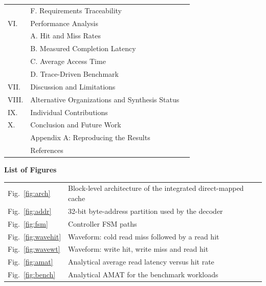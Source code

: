 \documentclass[conference,a4paper]{IEEEtran}
\begin{document}
\begin{tabular}{@{}p{1.2cm}p{12cm}r@{}}
 & \hspace{1em}F. Requirements Traceability & \pageref{sec:trace2}\\
VI. & Performance Analysis & \pageref{sec:perf}\\
 & \hspace{1em}A. Hit and Miss Rates & \pageref{sec:hit}\\
 & \hspace{1em}B. Measured Completion Latency & \pageref{sec:lat}\\
 & \hspace{1em}C. Average Access Time & \pageref{sec:amat}\\
 & \hspace{1em}D. Trace-Driven Benchmark & \pageref{sec:bench}\\
VII. & Discussion and Limitations & \pageref{sec:disc}\\
VIII. & Alternative Organizations and Synthesis Status & \pageref{sec:alt}\\
IX. & Individual Contributions & \pageref{sec:contrib}\\
X. & Conclusion and Future Work & \pageref{sec:concl}\\
 & Appendix A: Reproducing the Results & \pageref{app:repro}\\
 & References & \pageref{sec:refs}\\
\end{tabular}

\vspace{0.3cm}
\noindent\textbf{List of Figures}\\[2pt]
\begin{tabular}{@{}p{1.6cm}p{11.6cm}r@{}}
Fig.~\ref{fig:arch} & Block-level architecture of the integrated direct-mapped cache & \pageref{fig:arch}\\
Fig.~\ref{fig:addr} & 32-bit byte-address partition used by the decoder & \pageref{fig:addr}\\
Fig.~\ref{fig:fsm} & Controller FSM paths & \pageref{fig:fsm}\\
Fig.~\ref{fig:wavehit} & Waveform: cold read miss followed by a read hit & \pageref{fig:wavehit}\\
Fig.~\ref{fig:wavewt} & Waveform: write hit, write miss and read hit & \pageref{fig:wavewt}\\
Fig.~\ref{fig:amat} & Analytical average read latency versus hit rate & \pageref{fig:amat}\\
Fig.~\ref{fig:bench} & Analytical AMAT for the benchmark workloads & \pageref{fig:bench}\\
\end{tabular}
\end{document}
